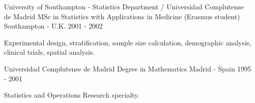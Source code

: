 \begin{cventries}
\cventry
{University of Southampton - Statistics Department / Universidad Complutense de Madrid} %
{MSc in Statistics with Applications in Medicine (Erasmus student)} %
{Southampton - U.K.} %
{2001 - 2002} %
{ %
\begin{cvitems}
\item {Experimental design, stratification, sample size calculation, demographic analysis, clinical trials, spatial analysis.}
\end{cvitems}
}

\cventry
{Universidad Complutense de Madrid} %
{Degree in Mathematics} %
{Madrid - Spain} %
{1995 - 2001} %
{ %
\begin{cvitems}
\item {Statistics and Operations Research specialty.}
\end{cvitems}
}



\end{cventries}
